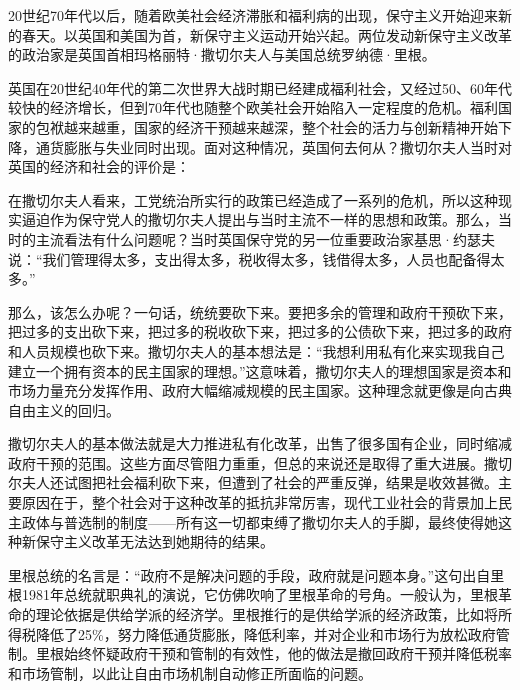 
20世纪70年代以后，随着欧美社会经济滞胀和福利病的出现，保守主义开始迎来新的春天。以英国和美国为首，新保守主义运动开始兴起。两位发动新保守主义改革的政治家是英国首相玛格丽特·撒切尔夫人与美国总统罗纳德·里根。

英国在20世纪40年代的第二次世界大战时期已经建成福利社会，又经过50、60年代较快的经济增长，但到70年代也随整个欧美社会开始陷入一定程度的危机。福利国家的包袱越来越重，国家的经济干预越来越深，整个社会的活力与创新精神开始下降，通货膨胀与失业同时出现。面对这种情况，英国何去何从？撒切尔夫人当时对英国的经济和社会的评价是：


在撒切尔夫人看来，工党统治所实行的政策已经造成了一系列的危机，所以这种现实逼迫作为保守党人的撒切尔夫人提出与当时主流不一样的思想和政策。那么，当时的主流看法有什么问题呢？当时英国保守党的另一位重要政治家基思·约瑟夫说：“我们管理得太多，支出得太多，税收得太多，钱借得太多，人员也配备得太多。”

那么，该怎么办呢？一句话，统统要砍下来。要把多余的管理和政府干预砍下来，把过多的支出砍下来，把过多的税收砍下来，把过多的公债砍下来，把过多的政府和人员规模也砍下来。撒切尔夫人的基本想法是：“我想利用私有化来实现我自己建立一个拥有资本的民主国家的理想。”这意味着，撒切尔夫人的理想国家是资本和市场力量充分发挥作用、政府大幅缩减规模的民主国家。这种理念就更像是向古典自由主义的回归。

撒切尔夫人的基本做法就是大力推进私有化改革，出售了很多国有企业，同时缩减政府干预的范围。这些方面尽管阻力重重，但总的来说还是取得了重大进展。撒切尔夫人还试图把社会福利砍下来，但遭到了社会的严重反弹，结果是收效甚微。主要原因在于，整个社会对于这种改革的抵抗非常厉害，现代工业社会的背景加上民主政体与普选制的制度——所有这一切都束缚了撒切尔夫人的手脚，最终使得她这种新保守主义改革无法达到她期待的结果。

里根总统的名言是：“政府不是解决问题的手段，政府就是问题本身。”这句出自里根1981年总统就职典礼的演说，它仿佛吹响了里根革命的号角。一般认为，里根革命的理论依据是供给学派的经济学。里根推行的是供给学派的经济政策，比如将所得税降低了25\%，努力降低通货膨胀，降低利率，并对企业和市场行为放松政府管制。里根始终怀疑政府干预和管制的有效性，他的做法是撤回政府干预并降低税率和市场管制，以此让自由市场机制自动修正所面临的问题。

